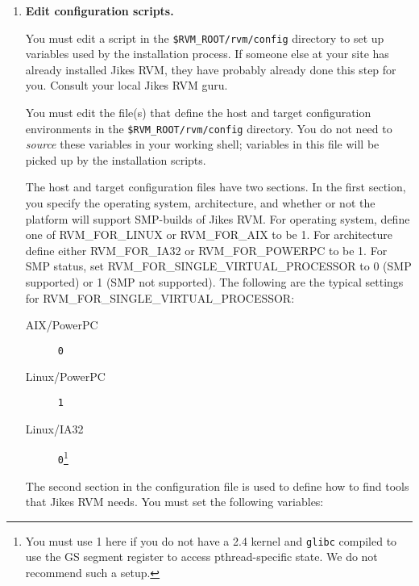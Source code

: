 \begin{enumerate}
{\em Note:} You should define each of these environment variables as an
{\em absolute} path.  The builder template expansion process will crash
and burn if you use a {\tt ..} in these paths.

For a Linux-Intel environment, the exports
would be replaced with the following:

\begin{verbatim}
setenv RVM_HOST_CONFIG $RVM_ROOT/rvm/config/i686-pc-linux-gnu
setenv RVM_TARGET_CONFIG $RVM_ROOT/rvm/config/i686-pc-linux-gnu
\end{verbatim}

These two variables point to the same file when the type of system  
doing the build is the same as where you are going 
the execute Jikes RVM.  To cross build a system
e.g., build on AIX\AIXTMFootnote/PowerPC\PowerPCTMFootnote\ for a
Linux/IA32 platform, see the section on Cross 
Platform Building.

\item {\bf Edit configuration scripts.}

You must edit a script in the {\tt \$RVM\_ROOT/rvm/config}  directory to set 
up variables used by the installation process.  
If someone else at your site has already installed Jikes RVM, they have
probably already done this step for you.  Consult your local Jikes RVM guru.

You must edit the file(s) that define the host and target configuration
environments in the {\tt \$RVM\_ROOT/rvm/config} directory.  
You do not need to {\em source} these variables in your working shell; 
variables in this file will be picked up by the installation scripts.  

The host and target configuration files have two sections.  In the
first section, you specify the operating system, architecture, and
whether or not the platform will support SMP-builds of Jikes RVM. 
For operating system, define one of RVM\_FOR\_LINUX or RVM\_FOR\_AIX
to be 1.  For architecture define either
RVM\_FOR\_IA32 or RVM\_FOR\_POWERPC to be 1.  For SMP status, set
RVM\_FOR\_SINGLE\_VIRTUAL\_PROCESSOR to 0 (SMP supported) or 1 (SMP not
supported).  The following are the typical settings for
RVM\_FOR\_SINGLE\_VIRTUAL\_PROCESSOR:
\begin{description}
\item[AIX/PowerPC] {\tt 0 }
\item[Linux/PowerPC] {\tt 1}
\item[Linux/IA32] {\tt 0}\footnote{You must use 1 here if you do not
have a 2.4 kernel and {\tt glibc} compiled to use the GS segment register to
access pthread-specific state.  We do not recommend such a setup.}
\end{description}                
The second section in the configuration file is used to define how to
find tools that Jikes RVM needs. You must set the following variables:


\end{enumerate}
